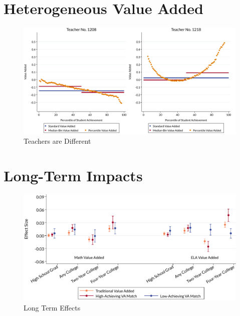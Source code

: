 \documentclass{article}
\theoremstyle{definition}
\theoremstyle{definition}
\theoremstyle{definition}
\begin{document}

\section{Heterogeneous Value Added} \label{hetva}


\begin{figure}


\begin{center}
\includegraphics[width=.85\textwidth]{slides/slides_pffls/fig1_heterogeneity.pdf}
\end{center}

    \caption{Teachers are Different}
    \label{fig:my_label}
\end{figure}


\section{Long-Term Impacts} \label{long}


\begin{figure}
\begin{center}


\includegraphics[width=.95\textwidth]{slides/slides_pffls/fig2b_longterm.pdf}
\end{center}
    \caption{Long Term Effects}
    \label{fig:my_label}
\end{figure}
\end{document}

